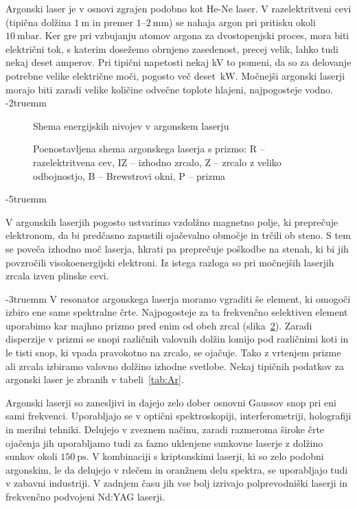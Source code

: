 Argonski laser je v osnovi zgrajen podobno kot He-Ne laser. 
V razelektritveni cevi
(tipična dolžina $1~\si{\metre}$ in premer $1$--$2~\si{\milli\metre}$)
se nahaja argon pri pritisku okoli $10~\si{\milli\bar}$. 
Ker gre pri vzbujanju atomov argona za dvostopenjski proces, mora biti električni tok, 
s katerim dosežemo obrnjeno zasedenost, precej velik, lahko tudi nekaj deset amperov. 
Pri tipični napetosti nekaj kV to pomeni, 
da so za delovanje potrebne velike električne moči, 
pogosto več deset~$\si{\kilo\watt}$. Močnejši argonski laserji morajo biti
zaradi velike količine odvečne toplote hlajeni, najpogosteje vodno.
\vglue-2truemm
\begin{figure}[ht]
\centering
\def\svgwidth{75truemm} 

\caption{Shema energijskih nivojev v argonskem laserju}
\label{fig:ArE}
\end{figure}
\begin{figure}[ht]
\centering
\def\svgwidth{90truemm} 

\caption{Poenostavljena shema argonskega laserja s prizmo: R -- razelektritvena cev, 
IZ -- izhodno zrcalo, Z -- zrcalo z veliko odbojnostjo, 
B -- Brewstrovi okni,  P -- prizma
}
\label{fig:ArS}
\end{figure}
\vglue-5truemm
\begin{remark}
V argonskih laserjih pogosto ustvarimo vzdolžno magnetno polje, ki preprečuje 
elektronom, da bi predčasno zapustili ojačevalno območje in trčili ob steno. S
tem se poveča izhodno moč laserja, hkrati pa preprečuje poškodbe na stenah, ki bi jih 
povzročili visokoenergijski elektroni. Iz istega razloga so pri močnejših
laserjih zrcala izven plinske cevi. 
\end{remark}
\vglue-3truemm
V resonator argonskega laserja moramo vgraditi še element, ki omogoči
izbiro ene same spektralne črte. Najpogosteje za ta frekvenčno selektiven element
uporabimo kar majhno prizmo pred enim od obeh zrcal (slika~\ref{fig:ArS}). Zaradi disperzije
v prizmi se snopi različnih valovnih dolžin lomijo pod različnimi koti in le tisti 
snop, ki vpada pravokotno na zrcalo, se ojačuje. Tako z vrtenjem prizme ali zrcala 
izbiramo valovno dolžino izhodne svetlobe. Nekaj tipičnih podatkov za argonski
laser je zbranih v tabeli~\ref{tab:Ar}.

Argonski laserji so zanesljivi in dajejo zelo dober osnovni Gaussov snop pri eni
sami frekvenci. Uporabljajo se v optični spektroskopiji,
interferometriji, holografiji in merilni tehniki. Delujejo v zveznem načinu,
zaradi razmeroma široke črte ojačenja jih uporabljamo tudi za fazno uklenjene
sunkovne laserje z dolžino sunkov okoli $150~\si{\pico\second}$. 
V kombinaciji s kriptonskimi laserji, ki so zelo podobni argonskim, le da delujejo
v rdečem in oranžnem delu spektra, se uporabljajo tudi v zabavni industriji.
V zadnjem času jih vse bolj izrivajo polprevodniški laserji in frekvenčno
podvojeni Nd:YAG laserji. 

